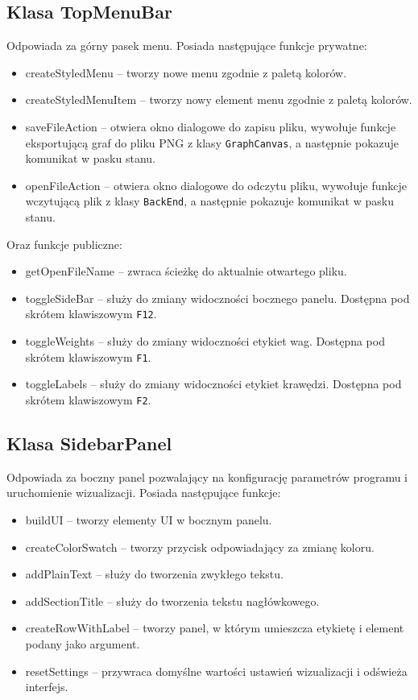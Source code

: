 \documentclass[]{article}
\begin{document}
    \subsection{Klasa TopMenuBar}
    Odpowiada za górny pasek menu. Posiada następujące funkcje prywatne:
    \begin{itemize}
        \item createStyledMenu -- tworzy nowe menu zgodnie z paletą kolorów.
        \item createStyledMenuItem -- tworzy nowy element menu zgodnie z paletą kolorów.
        \item saveFileAction -- otwiera okno dialogowe do zapisu pliku, wywołuje funkcje eksportującą graf do pliku PNG z klasy \texttt{GraphCanvas}, a następnie pokazuje komunikat w pasku stanu.
        \item openFileAction -- otwiera okno dialogowe do odczytu pliku, wywołuje funkcje wczytującą plik z klasy \texttt{BackEnd}, a następnie pokazuje komunikat w pasku stanu.
    \end{itemize}
    Oraz funkcje publiczne:
    \begin{itemize}
        \item getOpenFileName -- zwraca ścieżkę do aktualnie otwartego pliku.
        \item toggleSideBar -- służy do zmiany widoczności bocznego panelu. Dostępna pod skrótem klawiszowym \texttt{F12}.
        \item toggleWeights -- służy do zmiany widoczności etykiet wag. Dostępna pod skrótem klawiszowym \texttt{F1}.
        \item toggleLabels -- służy do zmiany widoczności etykiet krawędzi. Dostępna pod skrótem klawiszowym \texttt{F2}.
    \end{itemize}
    \subsection{Klasa SidebarPanel}
    Odpowiada za boczny panel pozwalający na konfigurację parametrów programu i uruchomienie wizualizacji. Posiada następujące funkcje:
    \begin{itemize}
        \item buildUI -- tworzy elementy UI w bocznym panelu.
        \item createColorSwatch -- tworzy przycisk odpowiadający za zmianę koloru.
        \item addPlainText -- służy do tworzenia zwykłego tekstu.
        \item addSectionTitle -- służy do tworzenia tekstu nagłówkowego.
        \item createRowWithLabel -- tworzy panel, w którym umieszcza etykietę i element podany jako argument.
        \item resetSettings -- przywraca domyślne wartości ustawień wizualizacji i odświeża interfejs.
    \end{itemize}
\end{document}

